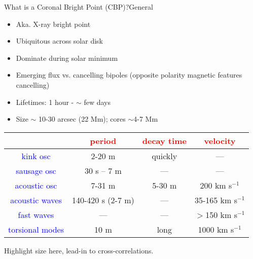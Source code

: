 \documentclass[9pt,table]{beamer}
\begin{document}
\begin{frame}{What is a Coronal Bright Point (CBP)?}{General}
    \begin{itemize}
        \item Aka. X-ray bright point
        \item Ubiquitous across solar disk
        \item Dominate during solar minimum
        \item Emerging flux vs. cancelling bipoles
            (opposite polarity magnetic features cancelling)
        \item Lifetimes: 1 hour - $\sim$ few days
        \item Size $\sim$ 10-30 arcsec (22 Mm); cores $\sim$4-7 Mm
    \end{itemize}
    \begin{center}
        \begin{tabular}{c|c|c|c|}
            \cline{2-4} & {\textbf{\textcolor{red}{period}}} &
            {\textbf{\textcolor{red}{decay time}}} &
            {\textbf{\textcolor{red}{velocity}}}\\
            \hline \multicolumn{0}{|c|}{\textcolor{blue}{kink osc}} &
                2{-}20 m & quickly & ---\\
            \hline \multicolumn{0}{|c|}{\textcolor{blue}{sausage osc}} &
                30 s -- 7 m & --- & ---\\
            \hline \multicolumn{0}{|c|}{\textcolor{blue}{acoustic osc}} &
                7{-}31 m & 5{-}30 m & 200 km s$^{-1}$\\
            \hline \multicolumn{0}{|c|}{\textcolor{blue}{acoustic waves}} &
            140{-}420 s (2{-}7 m) & --- & 35{-}165 km s$^{-1}$\\
            \hline \multicolumn{0}{|c|}{\textcolor{blue}{fast waves}} &
                --- & --- & $>$150 km s$^{-1}$\\
            \hline \multicolumn{0}{|c|}{\textcolor{blue}{torsional modes}} &
                10 m & long & 1000 km s$^{-1}$\\
            \hline
        \end{tabular}
    \end{center}
    Highlight size here, lead-in to cross-correlations.
\end{frame}

\begin{frame}{}
\end{frame}
\end{document}
